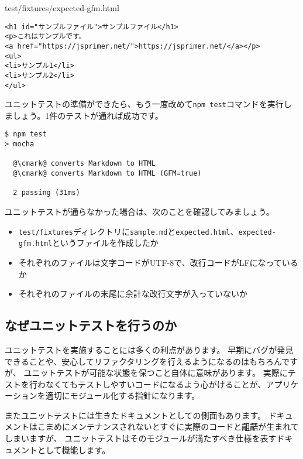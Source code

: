 \begin{listtitle}
test/fixtures/expected-gfm.html
\end{listtitle}
\begin{lstlisting}
<h1 id="サンプルファイル">サンプルファイル</h1>
<p>これはサンプルです。
<a href="https://jsprimer.net/">https://jsprimer.net/</a></p>
<ul>
<li>サンプル1</li>
<li>サンプル2</li>
</ul>
\end{lstlisting}
\listend

ユニットテストの準備ができたら、もう一度改めて\texttt{npm test}コマンドを実行しましょう。1件のテストが通れば成功です。

\begin{lstlisting}[escapechar=@]
$ npm test
> mocha

  @\cmark@ converts Markdown to HTML
  @\cmark@ converts Markdown to HTML (GFM=true)

  2 passing (31ms)
\end{lstlisting}

ユニットテストが通らなかった場合は、次のことを確認してみましょう。

\begin{itemize}
\item
  \texttt{test/fixtures}ディレクトリに\texttt{sample.md}と\texttt{expected.html}、\texttt{expected-gfm.html}というファイルを作成したか
\item
  それぞれのファイルは文字コードがUTF-8で、改行コードがLFになっているか
\item
  それぞれのファイルの末尾に余計な改行文字が入っていないか
\end{itemize}

\hypertarget{reason-for-unit-test}{%
\subsection{なぜユニットテストを行うのか}\label{reason-for-unit-test}}

ユニットテストを実施することには多くの利点があります。
早期にバグが発見できることや、安心してリファクタリングを行えるようになるのはもちろんですが、
ユニットテストが可能な状態を保つこと自体に意味があります。
実際にテストを行わなくてもテストしやすいコードになるよう心がけることが、アプリケーションを適切にモジュール化する指針になります。

またユニットテストには生きたドキュメントとしての側面もあります。
ドキュメントはこまめにメンテナンスされないとすぐに実際のコードと齟齬が生まれてしまいますが、
ユニットテストはそのモジュールが満たすべき仕様を表すドキュメントとして機能します。

